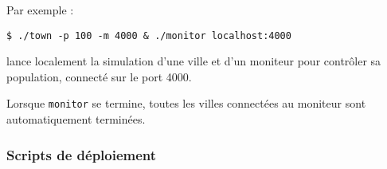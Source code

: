 \documentclass[10pt]{article}
\begin{document}
Par exemple :
\begin{verbatim}
$ ./town -p 100 -m 4000 & ./monitor localhost:4000
\end{verbatim}
lance localement la simulation d'une ville et d'un moniteur pour contrôler sa population, connecté sur le port 4000.

Lorsque \verb|monitor| se termine, toutes les villes connectées au moniteur sont automatiquement terminées.

\subsubsection{Scripts de déploiement}
\end{document}
